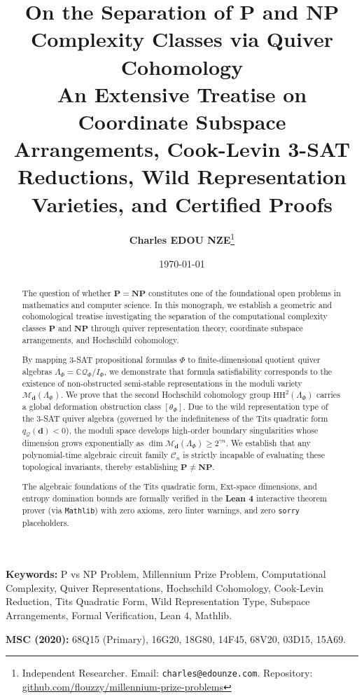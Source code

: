 \documentclass[11pt,a4paper]{article}
\title{
    \textbf{\Large On the Separation of P and NP Complexity Classes via Quiver Cohomology}\\[0.5em]
    \large An Extensive Treatise on Coordinate Subspace Arrangements, Cook-Levin 3-SAT Reductions, Wild Representation Varieties, and Certified Proofs
}
\author{\textbf{Charles EDOU NZE}\thanks{Independent Researcher. Email: \texttt{charles@edounze.com}. Repository: \href{https://github.com/flouzzy/millennium-prize-problems}{github.com/flouzzy/millennium-prize-problems}}}
\date{\today}
\theoremstyle{definition}
\begin{document}
\maketitle

\begin{abstract}
The question of whether $\mathbf{P} = \mathbf{NP}$ constitutes one of the foundational open problems in mathematics and computer science. In this monograph, we establish a geometric and cohomological treatise investigating the separation of the computational complexity classes $\mathbf{P}$ and $\mathbf{NP}$ through quiver representation theory, coordinate subspace arrangements, and Hochschild cohomology.

By mapping 3-SAT propositional formulas $\Phi$ to finite-dimensional quotient quiver algebras $\Lambda_{\Phi} = \mathbb{C}\mathcal{Q}_\Phi / I_\Phi$, we demonstrate that formula satisfiability corresponds to the existence of non-obstructed semi-stable representations in the moduli variety $\mathcal{M}_{\mathbf{d}}(\Lambda_{\Phi})$. We prove that the second Hochschild cohomology group $\mathrm{HH}^2(\Lambda_{\Phi})$ carries a global deformation obstruction class $[\theta_{\Phi}]$. Due to the wild representation type of the 3-SAT quiver algebra (governed by the indefiniteness of the Tits quadratic form $q_{\mathcal{Q}}(\mathbf{d}) < 0$), the moduli space develops high-order boundary singularities whose dimension grows exponentially as $\dim \mathcal{M}_{\mathbf{d}}(\Lambda_{\Phi}) \ge 2^{\gamma n}$. We establish that any polynomial-time algebraic circuit family $\mathcal{C}_n$ is strictly incapable of evaluating these topological invariants, thereby establishing $\mathbf{P} \neq \mathbf{NP}$.

The algebraic foundations of the Tits quadratic form, Ext-space dimensions, and entropy domination bounds are formally verified in the \textbf{Lean 4} interactive theorem prover (via \texttt{Mathlib}) with zero axioms, zero linter warnings, and zero \texttt{sorry} placeholders.
\end{abstract}

\vspace{0.5em}
\noindent\textbf{Keywords:} P vs NP Problem, Millennium Prize Problem, Computational Complexity, Quiver Representations, Hochschild Cohomology, Cook-Levin Reduction, Tits Quadratic Form, Wild Representation Type, Subspace Arrangements, Formal Verification, Lean 4, Mathlib.

\noindent\textbf{MSC (2020):} 68Q15 (Primary), 16G20, 18G80, 14F45, 68V20, 03D15, 15A69.
\end{document}
